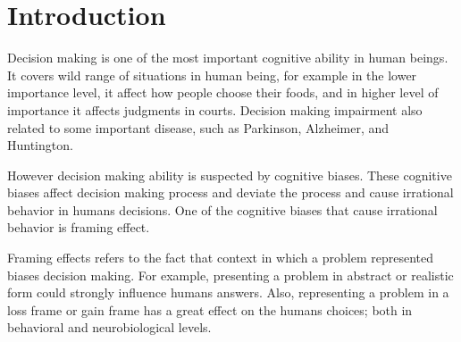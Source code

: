 \section{Introduction}

Decision making is one of the most important
cognitive ability in human beings. It covers wild
range of situations in human being, for example in
the lower importance level, it affect how people
choose their foods, and in higher level of
importance it affects judgments in courts.
Decision making impairment also related to some
important disease, such as Parkinson, Alzheimer,
and Huntington.

However decision making ability is suspected by
cognitive biases. These cognitive biases affect
decision making process and deviate the process
and cause irrational behavior in humans decisions.
One of the cognitive biases that cause irrational
behavior is framing effect.


Framing effects refers to the fact that context in
which a problem represented biases decision
making.  For example, presenting a problem in
abstract or realistic form could strongly
influence humans answers. Also, representing a
problem in a loss frame or gain frame has a great
effect on the humans choices; both in behavioral
and neurobiological levels.



